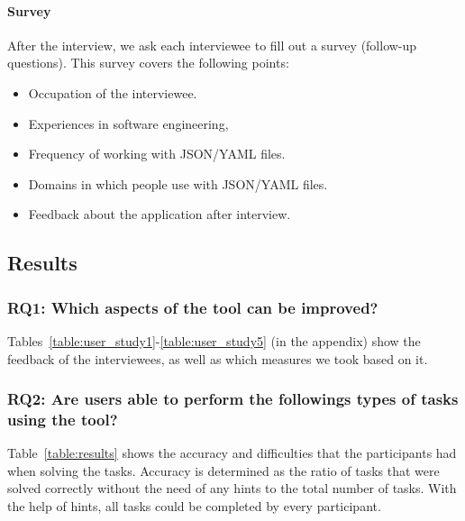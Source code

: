 \paragraph{Survey}
After the interview, we ask each interviewee to fill out a survey (follow-up questions).
This survey covers the following points:
\begin{itemize}
    \item Occupation of the interviewee.
    \item Experiences in software engineering,
    \item Frequency of working with JSON/YAML files.
    \item Domains in which people use with JSON/YAML files.
    \item Feedback about the application after interview.
\end{itemize}

\subsection{Results}\label{subsec:results}


\subsubsection{\textbf{RQ1:} Which aspects of the tool can be improved?} %
Tables~\ref{table:user_study1}-\ref{table:user_study5} (in the appendix) show the feedback of the interviewees, as well as which measures we took based on it.



\subsubsection{\textbf{RQ2:} Are users able to perform the followings types of tasks using the tool?}
Table~\ref{table:results} shows the accuracy and difficulties that the participants had when solving the tasks.
Accuracy is determined as the ratio of tasks that were solved correctly without the need of any hints to the total number of tasks.
With the help of hints, all tasks could be completed by every participant.

